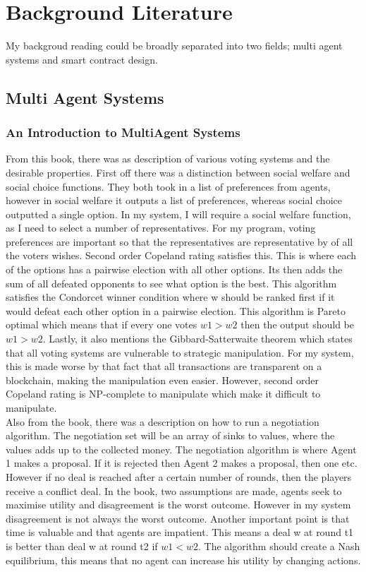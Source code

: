 \chapter{Background Literature} \label{Chapter: Background  Literature}
My backgroud reading could be broadly separated into two fields; multi agent systems and smart contract design.
\section{Multi Agent Systems}
\subsection{An Introduction to MultiAgent Systems \cite{Wooldridge:2009:pdflatex}}
From this book, there was as description of various voting systems and the desirable properties. First off there was a distinction between social welfare and social choice functions. They both took in a list of preferences from agents, however in social welfare it outputs a list of preferences, whereas social choice outputted a single option. In my system, I will require a social welfare function, as I need to select a number of representatives. For my program, voting preferences are important so that the representatives are representative by of all the voters wishes. Second order Copeland rating satisfies this. This is where each of the options has a pairwise election with all other options. Its then adds the sum of all defeated opponents  to see what option is the best. This algorithm satisfies the Condorcet winner condition where w should be ranked first if it would defeat each other option in a pairwise election. This algorithm is Pareto optimal which means that if every one votes $w1>w2$ then the output should be $w1>w2$. Lastly, it also mentions the Gibbard-Satterwaite theorem which states that all voting systems are vulnerable to strategic manipulation. For my system, this is made worse by that fact that all transactions are transparent on a blockchain, making the manipulation even easier. However, second order Copeland rating is NP-complete to manipulate which make it difficult to manipulate.  \\
Also from the book, there was a description on how to run a negotiation algorithm. The negotiation set will be an array of sinks to values, where the values adds up to the collected money. The negotiation algorithm is where Agent 1 makes a proposal. If it is rejected then Agent 2 makes a proposal, then one etc. However if no deal is reached after a certain number of rounds, then the players receive a conflict deal. In the book, two assumptions are made, agents seek to maximise utility and disagreement is the worst outcome. However in my system disagreement is not always the worst outcome. Another important point is that time is valuable and that agents are impatient. This means a deal w at round t1 is better than deal w at round t2 if $w1<w2$. The algorithm should create a Nash equilibrium, this means that no agent can increase his utility by changing actions. \\
